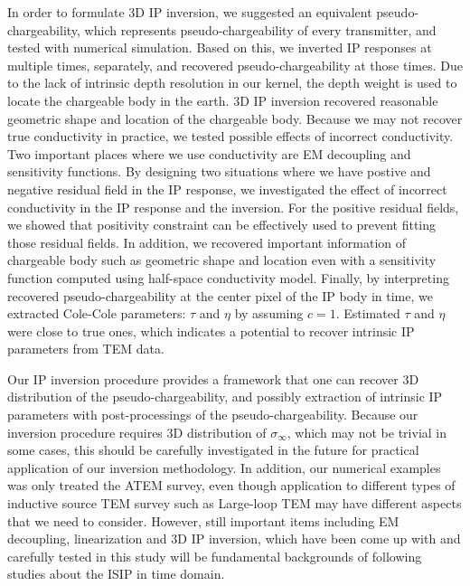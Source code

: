 \documentclass[a4paper, 11pt]{article}
\newcommand{\siginf}{\sigma_\infty}
\begin{document}
In order to formulate 3D IP inversion, we suggested an equivalent pseudo-chargeability, which represents pseudo-chargeability of every transmitter, and tested with numerical simulation. 
Based on this, we inverted IP responses at multiple times, separately, and recovered pseudo-chargeability at those times.
Due to the lack of intrinsic depth resolution in our kernel, the depth weight is used to locate the chargeable body in the earth. 
3D IP inversion recovered reasonable geometric shape and location of the chargeable body. 
Because we may not recover true conductivity in practice, we tested possible effects of incorrect conductivity. 
Two important places where we use conductivity are EM decoupling and sensitivity functions. 
By designing two situations where we have postive and negative residual field in the IP response, we investigated the effect of incorrect conductivity in the IP response and the inversion. 
For the positive residual fields, we showed that positivity constraint can be effectively used to prevent fitting those residual fields. 
In addition, we recovered important information of chargeable body such as geometric shape and location even with a sensitivity function computed using half-space conductivity model. 
Finally, by interpreting recovered pseudo-chargeability at the center pixel of the IP body in time, we extracted Cole-Cole parameters: $\tau$ and $\eta$ by assuming $c=1$. 
Estimated $\tau$ and $\eta$ were close to true ones, which indicates a potential to recover intrinsic IP parameters from TEM data.  

Our IP inversion procedure provides a framework that one can recover 3D distribution of the pseudo-chargeability, and possibly extraction of intrinsic IP parameters with post-processings of the pseudo-chargeability. 
Because our inversion procedure requires 3D distribution of $\siginf$, which may not be trivial in some cases, this should be carefully investigated in the future for practical application of our inversion methodology. 
In addition, our numerical examples was only treated the ATEM survey, even though application to different types of inductive source TEM survey such as Large-loop TEM may have different aspects that we need to consider. 
However, still important items including EM decoupling, linearization and 3D IP inversion, which have been come up with and carefully tested in this study will be fundamental backgrounds of following studies about the ISIP in time domain. 

\end{document}
